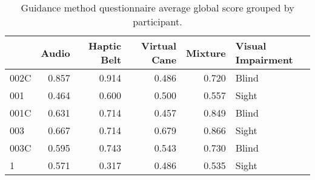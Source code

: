 
\begin{table}[!htb]
\centering
\caption{Guidance method questionnaire average global score grouped by participant.}
\label{tab:questionnaire_average}
\begin{tabular}{lrrrrl}
\toprule
{} &  Audio &  Haptic Belt &  Virtual Cane &  Mixture & Visual Impairment \\
\midrule
002C &  0.857 &        0.914 &         0.486 &    0.720 &             Blind \\
001  &  0.464 &        0.600 &         0.500 &    0.557 &             Sight \\
001C &  0.631 &        0.714 &         0.457 &    0.849 &             Blind \\
003  &  0.667 &        0.714 &         0.679 &    0.866 &             Sight \\
003C &  0.595 &        0.743 &         0.543 &    0.730 &             Blind \\
1    &  0.571 &        0.317 &         0.486 &    0.535 &             Sight \\
\bottomrule
\end{tabular}
\end{table}

